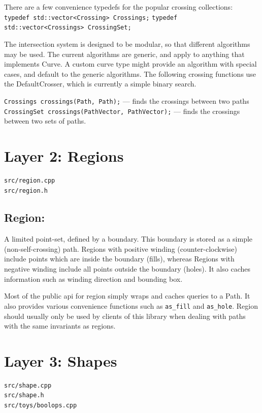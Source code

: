 \documentclass[openany]{book}
\begin{document}
There are a few convenience typedefs for the popular crossing collections:
\verb|typedef std::vector<Crossing> Crossings;|
\verb|typedef std::vector<Crossings> CrossingSet;|

The intersection system is designed to be modular, so that different algorithms may be used. The current algorithms are generic, and apply to anything that implements Curve. A custom curve type might provide an algorithm with special cases, and default to the generic algorithms. The following crossing functions use the DefaultCrosser, which is currently a simple binary search.

\verb|Crossings crossings(Path, Path);|  —  finds the crossings between two paths
\verb|CrossingSet crossings(PathVector, PathVector);|  —  finds the crossings between two sets of paths.


\section{Layer 2: Regions}

\begin{verbatim}
src/region.cpp
src/region.h
\end{verbatim}

\subsection{Region:}
A limited point-set, defined by a boundary. This boundary is stored as a simple (non-self-crossing) path. Regions with positive winding (counter-clockwise) include points which are inside the boundary (fills), whereas Regions with negative winding include all points outside the boundary (holes). It also caches information such as winding direction and bounding box.

Most of the public api for region simply wraps and caches queries to a Path. It also provides various convenience functions such as \verb|as_fill| and \verb|as_hole|. Region should usually only be used by clients of this library when dealing with paths with the same invariants as regions.


\section{Layer 3: Shapes}

\begin{verbatim}
src/shape.cpp
src/shape.h
src/toys/boolops.cpp
\end{verbatim}
\end{document}
